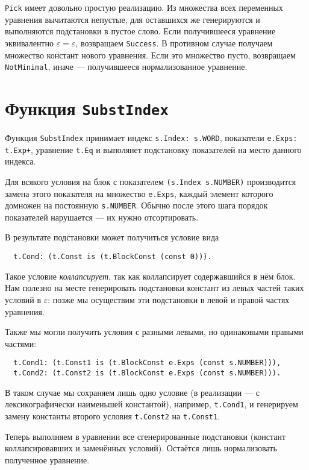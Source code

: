 \documentclass[12pt]{article}
\begin{document}
\texttt{Pick} имеет довольно простую реализацию. Из множества всех переменных
уравнения вычитаются непустые, для оставшихся же генерируются и выполняются
подстановки в пустое слово. Если получившееся уравнение эквивалентно
$\varepsilon = \varepsilon$, возвращаем \texttt{Success}. В противном случае
получаем множество констант нового уравнения. Если это множество пусто,
возвращаем \texttt{NotMinimal}, иначе --- получившееся нормализованное
уравнение.



\section{Функция \texttt{SubstIndex}} \label{substIndex}

Функция \texttt{SubstIndex} принимает индекс \texttt{s.Index: s.WORD},
показатели \texttt{e.Exps: t.Exp+}, уравнение \texttt{t.Eq} и выполянет
подстановку показателей на место данного индекса.

Для всякого условия на блок с показателем \texttt{(s.Index s.NUMBER)}
производится замена этого показателя на множество \texttt{e.Exps},
каждый элемент которого домножен на постоянную \texttt{s.NUMBER}.
Обычно после этого шага порядок показателей нарушается --- их
нужно отсортировать.

В результате подстановки может получиться условие вида
\begin{Verbatim}
  t.Cond: (t.Const is (t.BlockConst (const 0))).
\end{Verbatim}
Такое условие \textit{коллапсирует}, так как коллапсирует содержавшийся в нём
блок. Нам полезно на месте генерировать подстановки констант из левых частей
таких условий в $\varepsilon$: позже мы осуществим эти подстановки в левой и
правой частях уравнения.

Также мы могли получить условия с разными левыми, но одинаковыми правыми
частями:
\begin{Verbatim}
  t.Cond1: (t.Const1 is (t.BlockConst e.Exps (const s.NUMBER))),
  t.Cond2: (t.Const2 is (t.BlockConst e.Exps (const s.NUMBER))).
\end{Verbatim}
В таком случае мы сохраняем лишь одно условие (в реализации --- с
лексикографически наименьшей константой), например, \texttt{t.Cond1}, и
генерируем замену константы второго условия \texttt{t.Const2} на
\texttt{t.Const1}.

Теперь выполняем в уравнении все сгенерированные подстановки (констант
коллапсировавших и заменённых условий). Остаётся лишь нормализовать полученное
уравнение.
\end{document}
